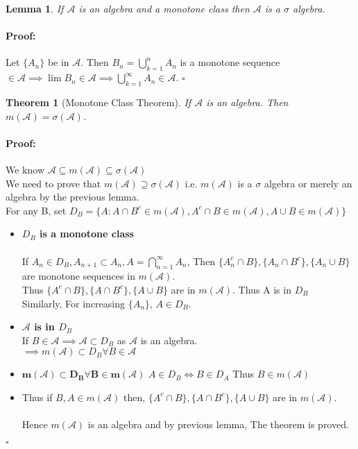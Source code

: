 \documentclass{article}
\newenvironment{proof}{\paragraph{Proof:}}{\hfill$\square$}
\newtheorem{theorem}{Theorem}[section]
\newtheorem{lemma}{Lemma}[section]
\begin{document}
\begin{lemma}
    If $\mathcal{A}$ is an algebra and a monotone class then $\mathcal{A}$ is a $\sigma$ algebra.
\end{lemma}
\begin{proof}
    Let $\{A_n\} $ be in $\mathcal{A} $. Then $B_n = \bigcup_{k=1}^n A_n$ is a monotone sequence $\in \mathcal{A} \implies \lim B_n \in \mathcal{A} \implies \bigcup_{k=1}^{\infty} A_n \in \mathcal{A}$.
\end{proof}
\begin{theorem}[Monotone Class Theorem]
    If $\mathcal{A} $ is an algebra. Then $m(\mathcal{A}) = \sigma (\mathcal{A})$.
\end{theorem}
\begin{proof}
    We know $\mathcal{A} \subseteq m(\mathcal{A}) \subseteq \sigma (\mathcal{A})$ 
    \\ We need to prove that $m(\mathcal{A} ) \supseteq \sigma (\mathcal{A} )$ i.e. $m(\mathcal{A} )$ is a $\sigma$ algebra or merely an algebra by the previous lemma.
    \\ For any B, set $D_B = \{ A: A \cap B^c \in m(\mathcal{A}), A^c \cap B \in m(\mathcal{A}) ,A\cup B \in m(\mathcal{A} )\}$
    \begin{itemize}
        \item \textbf{$D_B$ is a monotone class}\\ \\
             If $A_n \in D_B , A_{n+1} \subset A_n, A= \bigcap_{n=1}^{\infty} A_n $, Then $\{ A_n^c \cap B \}, \{ A_n \cap B^c \} ,\{ A_n \cup B \}$ are monotone sequences in $m(\mathcal{A} )$. \\
             Thus $\{ A^c \cap B \}, \{ A \cap B^c \} ,\{ A \cup B \}$ are in $m(\mathcal{A} )$. Thus A is in $D_B$\\
             Similarly, For increasing $\{ A_n\}$, $A \in D_B $.
        \item \textbf{$\mathcal{A} $ is in $D_B$}
        \\
        If $B \in \mathcal{A} \implies \mathcal{A} \subset D_B $ as $\mathcal{A} $ is an algebra. \\
        $\implies m(\mathcal{A} ) \subset D_B \forall B \in \mathcal{A} $ 
        \item $\mathbf{m(\mathcal{A} ) \subset D_B \forall B \in m(\mathcal{A}) }$
        $A \in D_B \iff B \in D_A$  Thus $B \in m(\mathcal{A} )$ 
        \item Thus if $B,A \in m(\mathcal{A} )$ then, $\{ A^c \cap B \}, \{ A \cap B^c \} ,\{ A \cup B \}$ are in $m(\mathcal{A} )$. \\
        \\ Hence $m(\mathcal{A} )$ is an algebra and by previous lemma, The theorem is proved. 
    \end{itemize} 
\end{proof}
\end{document}

